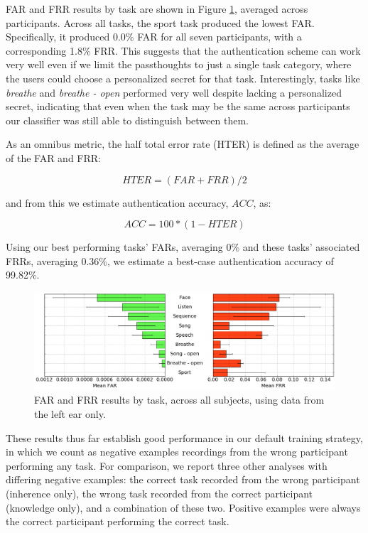 \documentclass{sigchi}
\begin{document}
FAR and FRR results by task are shown in Figure \ref{fig:meanByTask}, averaged across participants. Across all tasks, the sport task produced the lowest FAR. Specifically, it produced 0.0\% FAR for all seven participants, with a corresponding 1.8\% FRR. This suggests that the authentication scheme can work very well even if we limit the passthoughts to just a single task category, where the users could choose a personalized secret for that task. Interestingly, tasks like \textit{breathe} and \textit{breathe - open} performed very well despite lacking a personalized secret, indicating that even when the task may be the same across participants our classifier was still able to distinguish between them.

As an omnibus metric, the half total error rate (HTER) is defined as the average of the FAR and FRR: 

\[ HTER = (FAR + FRR) / 2 \]

and from this we estimate authentication accuracy, $ACC$, as:

\[ ACC = 100*(1-HTER) \]

Using our best performing tasks' FARs, averaging 0\% and these tasks' associated FRRs, averaging 0.36\%, we estimate a best-case authentication accuracy of 99.82\%.

\begin{figure}[t]
\centering
\includegraphics[width=.9\linewidth]{./figures/mean-far-and-frr-by-task.png}
\caption{FAR and FRR results by task, across all subjects, using data from the left ear only.}
\label{fig:meanByTask}
\end{figure}

These results thus far establish good performance in our default training strategy, in which we count as negative examples recordings from the wrong participant performing any task. For comparison, we report three other analyses with differing negative examples: the correct task recorded from the wrong participant (inherence only), the wrong task recorded from the correct participant (knowledge only), and a combination of these two. Positive examples were always the correct participant performing the correct task.
\end{document}
